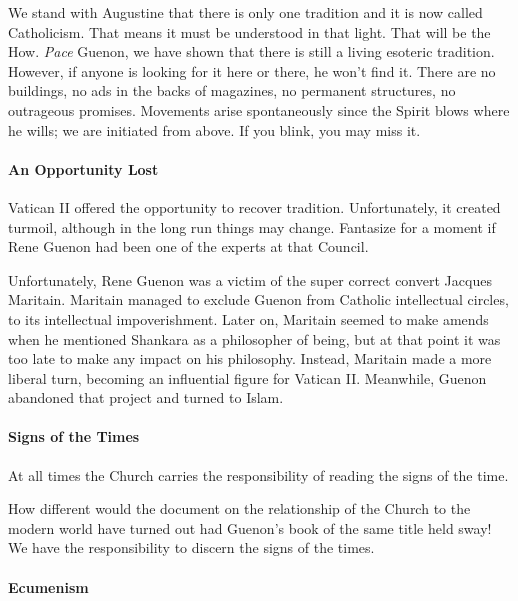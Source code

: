 We stand with Augustine that there is only one tradition and it is now called Catholicism. That means it must be understood in that light. That will be the How. \emph{Pace} Guenon, we have shown that there is still a living esoteric tradition. However, if anyone is looking for it here or there, he won't find it. There are no buildings, no ads in the backs of magazines, no permanent structures, no outrageous promises. Movements arise spontaneously since the Spirit blows where he wills; we are initiated from above. If you blink, you may miss it.

\paragraph{An Opportunity Lost}


Vatican II offered the opportunity to recover tradition. Unfortunately, it created turmoil, although in the long run things may change. Fantasize for a moment if Rene Guenon had been one of the experts at that Council.

Unfortunately, Rene Guenon was a victim of the super correct convert Jacques Maritain. Maritain managed to exclude Guenon from Catholic intellectual circles, to its intellectual impoverishment. Later on, Maritain seemed to make amends when he mentioned Shankara as a philosopher of being, but at that point it was too late to make any impact on his philosophy. Instead, Maritain made a more liberal turn, becoming an influential figure for Vatican II. Meanwhile, Guenon abandoned that project and turned to Islam.

\paragraph{Signs of the Times}


\begin{quotex}
At all times the Church carries the responsibility of reading the signs of the time. 
\end{quotex}


How different would the document on the relationship of the Church to the modern world have turned out had Guenon's book of the same title held sway! We have the responsibility to discern the signs of the times.

\paragraph{Ecumenism}


